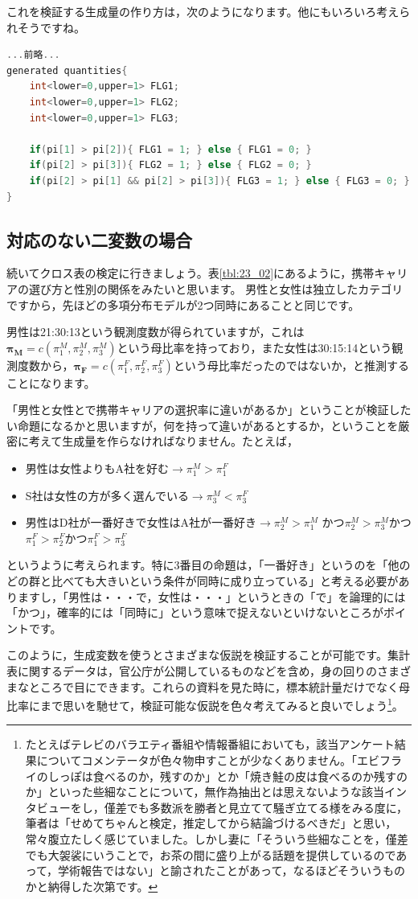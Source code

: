 \documentclass{ltjsbook}
\begin{document}
これを検証する生成量の作り方は，次のようになります。他にもいろいろ考えられそうですね。
\begin{lstlisting}[language=C++,label={stan::23_02},caption={多項分布からのデータ生成モデル}]
...前略...
generated quantities{
    int<lower=0,upper=1> FLG1;
    int<lower=0,upper=1> FLG2;
    int<lower=0,upper=1> FLG3;
    
    if(pi[1] > pi[2]){ FLG1 = 1; } else { FLG1 = 0; }
    if(pi[2] > pi[3]){ FLG2 = 1; } else { FLG2 = 0; }
    if(pi[2] > pi[1] && pi[2] > pi[3]){ FLG3 = 1; } else { FLG3 = 0; }
}
\end{lstlisting}
\subsection{対応のない二変数の場合}
続いてクロス表の検定に行きましょう。表\ref{tbl:23_02}にあるように，携帯キャリアの選び方と性別の関係をみたいと思います。
男性と女性は独立したカテゴリですから，先ほどの多項分布モデルが2つ同時にあることと同じです。

男性は21:30:13という観測度数が得られていますが，これは$\bm{\pi_M} = c(\pi_1^M,\pi_2^M,\pi_3^M)$という母比率を持っており，また女性は30:15:14という観測度数から，$\bm{\pi_F} = c(\pi_1^F,\pi_2^F,\pi_3^F)$という母比率だったのではないか，と推測することになります。

「男性と女性とで携帯キャリアの選択率に違いがあるか」ということが検証したい命題になるかと思いますが，何を持って違いがあるとするか，ということを厳密に考えて生成量を作らなければなりません。たとえば，
\begin{itemize}
    \item 男性は女性よりもA社を好む$\to \pi_1^M > \pi_1^F$
    \item S社は女性の方が多く選んでいる$\to \pi_3^M < \pi_3^F$
    \item 男性はD社が一番好きで女性はA社が一番好き$\to \pi_2^M > \pi_1^M$ かつ$\pi_2^M > \pi_3^M$かつ$\pi_1^F > \pi_2^F $かつ$ \pi_1^F > \pi_3^F$
\end{itemize}
というように考えられます。特に3番目の命題は，「一番好き」というのを「他のどの群と比べても大きいという条件が同時に成り立っている」と考える必要がありますし，「男性は・・・で，女性は・・・」というときの「で」を論理的には「かつ」，確率的には「同時に」という意味で捉えないといけないところがポイントです。

このように，生成変数を使うとさまざまな仮説を検証することが可能です。集計表に関するデータは，官公庁が公開しているものなどを含め，身の回りのさまざまなところで目にできます。これらの資料を見た時に，標本統計量だけでなく母比率にまで思いを馳せて，検証可能な仮説を色々考えてみると良いでしょう\footnote{たとえばテレビのバラエティ番組や情報番組においても，該当アンケート結果についてコメンテータが色々物申すことが少なくありません。「エビフライのしっぽは食べるのか，残すのか」とか「焼き鮭の皮は食べるのか残すのか」といった些細なことについて，無作為抽出とは思えないような該当インタビューをし，僅差でも多数派を勝者と見立てて騒ぎ立てる様をみる度に，筆者は「せめてちゃんと検定，推定してから結論づけるべきだ」と思い，常々腹立たしく感じていました。しかし妻に「そういう些細なことを，僅差でも大袈裟にいうことで，お茶の間に盛り上がる話題を提供しているのであって，学術報告ではない」と諭されたことがあって，なるほどそういうものかと納得した次第です。}。
\end{document}
